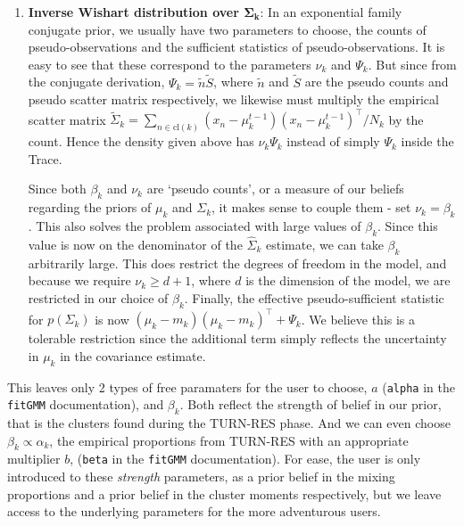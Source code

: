 \documentclass[11pt]{article}
\def\bs{\boldsymbol}
\def\Tr{^\top}
\begin{document}
\begin{enumerate}
\item \textbf{Inverse Wishart distribution over $\bs{\Sigma_k}$}: In an exponential family conjugate prior, we usually have two parameters to choose, the counts of pseudo-observations and the sufficient statistics of pseudo-observations. It is easy to see that these correspond to the parameters $\nu_k$ and $\Psi_k$. But since from the conjugate derivation, $\Psi_k = \tilde{n}\tilde{S}$, where $\tilde{n}$ and $\tilde{S}$ are the pseudo counts and pseudo scatter matrix respectively, we likewise must multiply the empirical scatter matrix $\tilde{\Sigma}_k = \sum_{n \in \text{cl}(k)} (x_n - \mu_k^{t-1})(x_n - \mu_k^{t-1})\Tr /N_k$ by the count. Hence the density given above has $\nu_k\Psi_k$ instead of simply $\Psi_k$ inside the Trace.\par
Since both $\beta_k$ and $\nu_k$ are `pseudo counts', or a measure of our beliefs regarding the priors of $\mu_k$ and $\Sigma_k$, it makes sense to couple them - set $\nu_k = \beta_k$. This also solves the problem associated with large values of $\beta_k$. Since this value is now on the denominator of the $\hat\Sigma_k$ estimate, we can take $\beta_k$ arbitrarily large. This does restrict the degrees of freedom in the model, and because we require $\nu_k \ge d+1$, where $d$ is the dimension of the model, we are restricted in our choice of $\beta_k$. Finally, the effective pseudo-sufficient statistic for $p(\Sigma_k)$ is now $(\mu_k - m_k)(\mu_k - m_k)\Tr + \Psi_k$. We believe this is a tolerable restriction since the additional term simply reflects the uncertainty in $\mu_k$ in the covariance estimate.
\end{enumerate}
This leaves only 2 types of free paramaters for the user to choose, $a$ (\texttt{alpha} in the \texttt{fitGMM} documentation), and $\beta_k$. Both reflect the strength of belief in our prior, that is the clusters found during the TURN-RES phase. And we can even choose $\beta_k \propto \alpha_k$, the empirical proportions from TURN-RES with an appropriate multiplier $b$, (\texttt{beta} in the \texttt{fitGMM} documentation). For ease, the user is only introduced to these \emph{strength} parameters, as a prior belief in the mixing proportions and a prior belief in the cluster moments respectively, but we leave access to the underlying parameters for the more adventurous users.
\vspace{20pt}
\end{document}
